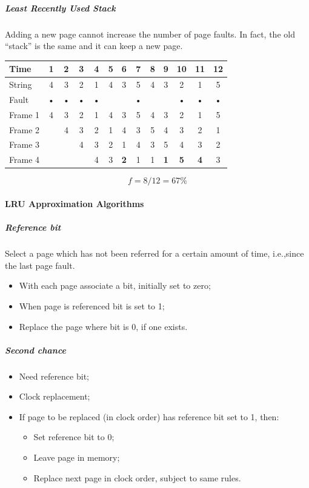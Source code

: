 \subparagraph{Least Recently Used Stack}
Adding a new page cannot increase the number of page faults. In fact, the old ``stack'' is the same and it can keep a new page.
\begin{center}
\begin{tabular}{l|cccccccccccc}
\hline
Time & 1 & 2 & 3 & 4 & 5 & 6 & 7 & 8 & 9 & 10 & 11 & 12 \\
\hline
String & 4 & 3 & 2 & 1 & 4 & 3 & 5 & 4 & 3 & 2 & 1 & 5 \\
\hline
Fault & • & • & • & • & & & • & & & • & • & • \\
\hline
Frame 1 & 4 & 3 & 2 & 1 & 4 & 3 & 5 & 4 & 3 & 2 & 1 & 5 \\
Frame 2 & & 4 & 3 & 2 & 1 & 4 & 3 & 5 & 4 & 3 & 2 & 1 \\
Frame 3 & & & 4 & 3 & 2 & 1 & 4 & 3 & 5 & 4 & 3 & 2 \\
Frame 4 & & & & 4 & 3 & \textbf{2} & 1 & 1 & \textbf{1} & \textbf{5} & \textbf{4} & 3 \\
\hline
\end{tabular}
\[ f = 8/12 = 67 \% \]
\end{center}

\paragraph{LRU Approximation Algorithms}
\subparagraph{Reference bit}
Select a page which has not been referred for a certain amount of time, i.e.,\@ since the last page fault.
\begin{itemize}
\item With each page associate a bit, initially set to zero;
\item When page is referenced bit is set to 1;
\item Replace the page where bit is 0, if one exists.
\end{itemize}
\subparagraph{Second chance}
\begin{itemize}
\item Need reference bit;
\item Clock replacement;
\item If page to be replaced (in clock order) has reference bit set to 1, then:
\begin{itemize}
\item Set reference bit to 0;
\item Leave page in memory;
\item Replace next page in clock order, subject to same rules.
\end{itemize}
\end{itemize}

